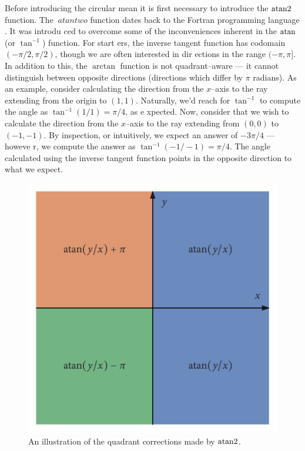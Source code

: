 Before introducing the circular mean it is first necessary to introduce the $\operatorname{atan2}$ function. The $\
atantwo$ function dates back to the Fortran programming language \parencite{organick66}. It was introdu
ced to overcome some of the inconveniences inherent in the $\atan$ (or $\tan^{-1}$) function. For start
ers, the inverse tangent function has codomain $(-\pi/2, \pi/2)$, though we are often interested in dir
ections in the range $(-\pi, \pi]$. In addition to this, the $\arctan$ function is not quadrant--aware 
--- it cannot distinguish between opposite directions (directions which differ by $\pi$ radians). As an
 example, consider calculating the direction from the $x$--axis to the ray extending from the origin to
 $(1, 1)$. Naturally, we'd reach for $\tan^{-1}$ to compute the angle as $\tan^{-1}(1/1) = \pi/4$, as e
xpected. Now, consider that we wish to calculate the direction from the $x$--axis to the ray extending 
from $(0, 0)$ to $(-1, -1)$. By inspection, or intuitively, we expect an answer of $-3\pi/4$ --- howeve
r, we compute the answer as $\tan^{-1}(-1/-1) = \pi/4$. The angle calculated using the inverse tangent 
function points in the opposite direction to what we expect.

\begin{figure}
	\includegraphics{atan_quadrants.pdf}
	\caption{An illustration of the quadrant corrections made by $\operatorname{atan2}$.}
	\label{fig:atan_quadrants}
\end{figure}

